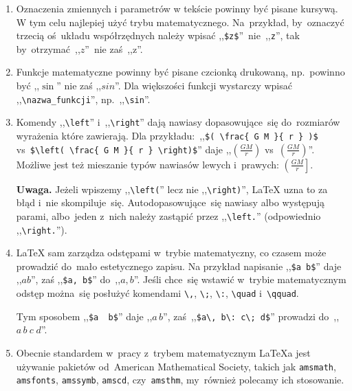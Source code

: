 \documentclass[a4paper,11pt]{article}
\newcommand{\tbs}{\textbackslash}  %
\begin{document}
\begin{enumerate}
\item Oznaczenia zmiennych i parametrów w tekście powinny być pisane
  kursywą. W tym celu najlepiej użyć trybu matematycznego.
  Na~przykład, by~oznaczyć trzecią oś~układu współrzędnych należy
  wpisać ,,\texttt{\$z\$}''~nie~,,\texttt{z}'', tak
  by~otrzymać~,,$z$''~nie zaś~,,z''.

\item Funkcje matematyczne powinny być pisane czcionką drukowaną,
  np.~powinno być ,,$\sin$'' nie zaś ,,$sin$''. Dla większości funkcji
  wystarczy wpisać ,,\texttt{\tbs nazwa\_funkcji}'',
  np.~,,\texttt{\tbs sin}''.

\item Komendy ,,\texttt{\tbs left}'' i~,,\texttt{\tbs right}'' dają
  nawiasy dopasowujące~się do~rozmiarów wyrażenia które zawierają. Dla
  przykładu:~,,\texttt{\$( \tbs frac\{ G M \}\{ r \} )\$}
  vs~\texttt{\$\tbs left( \tbs frac\{ G M \}\{ r \} \tbs right)\$}''
  daje ,,$( \frac{ G M }{ r } )$
  vs~$\left( \frac{ G M }{ r } \right)$''. Możliwe jest też mieszanie
  typów nawiasów lewych i~prawych: $\left( \frac{ G M }{ r } \right]$.

  \textbf{Uwaga.} Jeżeli wpiszemy ,,\texttt{\tbs left(}'' lecz nie
  ,,\texttt{\tbs right)}'', \LaTeX{} uzna to za błąd i~nie
  skompiluje~się. Autodopasowujące~się nawiasy albo występują parami,
  albo~jeden z~nich należy zastąpić przez ,,\texttt{\tbs left.}''
  (odpowiednio ,,\texttt{\tbs right.}'').

\item \LaTeX{} sam zarządza odstępami w~trybie matematyczny, co czasem
  może prowadzić do~mało estetycznego zapisu. Na przykład napisanie
  ,,\texttt{\$a b\$}'' daje ,,$a b$'', zaś ,,\texttt{\$a, b\$}''
  do~,,$a, b$''. Jeśli chce~się wstawić w~trybie matematycznym odstęp
  można~się posłużyć komendami \texttt{\tbs ,}, \texttt{\tbs ;},
  \texttt{\tbs :}, \texttt{\tbs quad} i~\texttt{\tbs qquad}.

  Tym sposobem ,,\texttt{\$a\, b\$}'' daje ,,$a\, b$'',
  zaś~,,\texttt{\$a\tbs , b\tbs : c\tbs ; d\$}'' prowadzi
  do~,,$a\, b\: c\; d$''.

\item Obecnie standardem w~pracy z~trybem matematycznym \LaTeX a jest
  używanie pakietów od~American Mathematical Society, takich jak
  \texttt{amsmath}, \texttt{amsfonts}, \texttt{amssymb},
  \texttt{amscd}, czy~\texttt{amsthm}, my~również polecamy ich
  stosowanie.


\end{enumerate}
\end{document}
